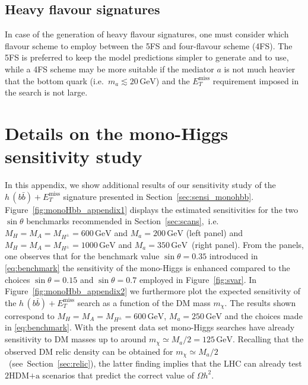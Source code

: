 \documentclass[review]{elsarticle}
\newcommand{\MET}{\ensuremath{E_T^\mathrm{miss}}\xspace}
\newcommand{\mA}{\ensuremath{M_{A}}\xspace}
\newcommand{\ma}{\ensuremath{M_{a}}\xspace}
\newcommand{\mH}{\ensuremath{M_{H}}\xspace}
\newcommand{\mHc}{\ensuremath{M_{H^{\pm}}}\xspace}
\newcommand{\hdma}{\ensuremath{\textrm{2HDM+a}}\xspace}
\begin{document}
\subsection{Heavy flavour signatures}

In case of the generation of heavy flavour signatures, one must consider which flavour scheme to employ between the 5FS and four-flavour scheme (4FS). The 5FS is preferred to keep the model predictions simpler to generate and to use, while a 4FS scheme may be more suitable if the mediator $a$ is not much heavier that the bottom quark (i.e.~$m_a \lesssim 20 \, {\mathrm{GeV}}$) and the $\MET$ requirement imposed in the search is not large. 


\section{Details on the mono-Higgs sensitivity study}
\label{app:extramonoh}

In this appendix, we  show additional results  of our sensitivity study of the $h \, (b \bar b)+\MET$ signature presented in Section~\ref{sec:sensi_monohbb}. Figure~\ref{fig:monoHbb_appendix1} displays the estimated sensitivities for the two $\sin \theta$ benchmarks recommended in Section~\ref{sec:scans},~i.e.~$\mH = \mA = \mHc = 600 \, {\mathrm{GeV}}$ and $\ma = 200 \, {\mathrm{GeV}}$ (left panel) and $\mH = \mA = \mHc = 1000 \, {\mathrm{GeV}}$ and $\ma = 350 \, {\mathrm{GeV}}$~(right panel). From the panels, one observes that for the benchmark value $\sin \theta = 0.35$ introduced in \eqref{eq:benchmark} the sensitivity of the mono-Higgs is enhanced compared to the choices  $\sin \theta = 0.15$ and  $\sin \theta = 0.7$ employed in Figure~\ref{fig:svar}. In Figure~\ref{fig:monoHbb_appendix2} we furthermore  plot the expected sensitivity of the $h \, (b \bar b)+\MET$ search as a function of the DM mass $m_\chi$. The  results shown correspond to $\mH = \mA = \mHc = 600 \, {\mathrm{GeV}}$, $\ma = 250 \, {\mathrm{GeV}}$ and the choices made in \eqref{eq:benchmark}. With the present data set mono-Higgs searches have already sensitivity to DM masses up to around $m_\chi \simeq \ma/2 = 125 \, {\mathrm{GeV}}$. Recalling that the  observed DM relic density can be obtained for $m_\chi \simeq \ma/2$ ~(see~Section~\ref{sec:relic}), the latter finding implies that the LHC can already test  \hdma scenarios that predict the correct value of $\Omega h^2$. 
\end{document}
